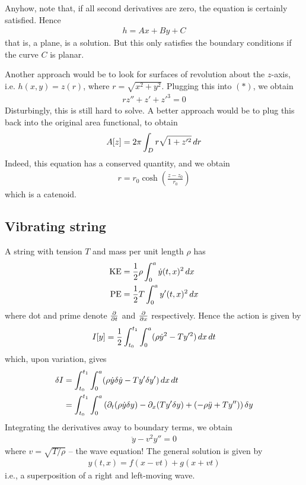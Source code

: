 \documentclass{../../template/note}
\begin{document}
    Anyhow, note that, if all second derivatives are zero, the equation is certainly satisfied. Hence
    \begin{align*}
        h = Ax + By + C
    \end{align*}
    that is, a plane, is a solution. But this only satisfies the boundary conditions if the curve $C$ is planar.

    Another approach would be to look for surfaces of revolution about the $z$-axis, i.e. $h(x, y) = z(r)$, where $r = \sqrt{x^2+y^2}$. Plugging this into $(*)$, we obtain
    \begin{align*}
        rz'' + z' + z'^3 = 0
    \end{align*}
    Disturbingly, this is still hard to solve. A better approach would be to plug this back into the original area functional, to obtain
    \begin{align*}
        A[z] = 2\pi \int_D r\sqrt{1+z'^2} \,d{r}
    \end{align*}
    Indeed, this equation has a conserved quantity, and we obtain
    \begin{align*}
        r = r_0 \cosh \left(\frac{z-z_0}{r_0}\right)
    \end{align*}
    which is a catenoid.
    
    \subsection{Vibrating string}

    A string with tension $T$ and mass per unit length $\rho$ has
    \begin{align*}
        \mathrm{KE} &= \frac 1 2 \rho \int_0^a \dot y(t, x)^2 \,d{x} \\
        \mathrm{PE} &= \frac 1 2 T \int_0^a y'(t, x)^2 \,d{x}
    \end{align*}
    where dot and prime denote $\pd{}{t}$ and $\pd{}{x}$ respectively. Hence the action is given by
    \begin{align*}
        I[y] = \frac 1 2 \int_{t_0}^{t_1} \int_0^a (\rho \dot y^2 - Ty'^2) \,d{x} \,d{t}
    \end{align*}
    which, upon variation, gives
    \begin{align*}
        \delta I &= \int_{t_0}^{t_1} \int_0^a (\rho \dot y \delta \dot y - T y' \delta y') \,d{x} \,d{t} \\
        &= \int_{t_0}^{t_1} \int_0^a \left(\partial_t(\rho \dot y \delta y) - \partial_x (Ty' \delta y) + (-\rho \ddot y + Ty'')\right) \delta y
    \end{align*}
    Integrating the derivatives away to boundary terms, we obtain
    \begin{align*}
        \ddot y - v^2 y'' = 0
    \end{align*}
    where $v = \sqrt{T/\rho}$ -- the wave equation! The general solution is given by
    \begin{align*}
        y(t, x) = f(x - vt) + g(x + vt)
    \end{align*}
    i.e., a superposition of a right and left-moving wave. 
\end{document}
